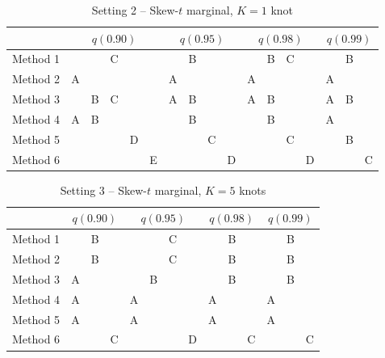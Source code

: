 \documentclass[useAMS,usenatbib,referee]{biomweb}
\begin{document}
\begin{table}[htbp]
  \centering
  \caption{Setting 2 -- Skew-$t$ marginal, $K = 1$ knot}
  \label{tbl:st1sim}
  \begin{tabular}{|l|ccccc|cccc|cccc|ccc|}
    \cline{2-17}
    \multicolumn{1}{c}{} & \multicolumn{5}{|c}{$q(0.90)$} & \multicolumn{4}{|c}{$q(0.95)$} & \multicolumn{4}{|c}{$q(0.98)$} & \multicolumn{3}{|c|}{$q(0.99)$} \\
    \hline
    Method 1 &   &   & C &   &   &   & B &   &   &   & B & C &   &   & B &   \\
    \hline
    Method 2 & A &   &   &   &   & A &   &   &   & A &   &   &   & A &   &   \\
    \hline
    Method 3 &   & B & C &   &   & A & B &   &   & A & B &   &   & A & B &   \\
    \hline
    Method 4 & A & B &   &   &   &   & B &   &   &   & B &   &   & A &   &   \\
    \hline
    Method 5 &   &   &   & D &   &   &   & C &   &   &   & C &   &   & B &   \\
    \hline
    Method 6 &   &   &   &   & E &   &   &   & D &   &   &   & D &   &   & C \\
    \hline
  \end{tabular}
\end{table}

\begin{table}[htbp]
  \centering
  \caption{Setting 3 -- Skew-$t$ marginal, $K = 5$ knots}
  \label{tbl:st5sim}
  \begin{tabular}{|l|ccc|cccc|ccc|ccc|}
    \cline{2-14}
    \multicolumn{1}{c}{} & \multicolumn{3}{|c}{$q(0.90)$} & \multicolumn{4}{|c}{$q(0.95)$} & \multicolumn{3}{|c}{$q(0.98)$} & \multicolumn{3}{|c|}{$q(0.99)$} \\
    \hline
    Method 1 &   & B &   &   &   & C &   &   & B &   &   & B &   \\
    \hline
    Method 2 &   & B &   &   &   & C &   &   & B &   &   & B &   \\
    \hline
    Method 3 & A &   &   &   & B &   &   &   & B &   &   & B &   \\
    \hline
    Method 4 & A &   &   & A &   &   &   & A &   &   & A &   &   \\
    \hline
    Method 5 & A &   &   & A &   &   &   & A &   &   & A &   &   \\
    \hline
    Method 6 &   &   & C &   &   &   & D &   &   & C &   &   & C \\
    \hline
  \end{tabular}
\end{table}
\end{document}
